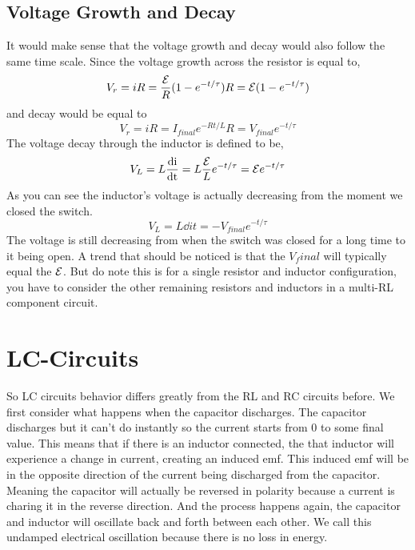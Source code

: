\subsection{Voltage Growth and Decay}
It would make sense that the voltage growth and decay would also follow the same time scale.
Since the voltage growth across the resistor is equal to,
\begin{equation*}
	V_r = iR = \frac{\mathcal{E}}{R}(1-e^{-t/\tau})R=\mathcal{E}(1-e^{-t/\tau})
\end{equation*}
and decay would be equal to 
\begin{equation*}
	V_r = iR = I_{final}e^{-Rt/L}R = V_{final}e^{-t/\tau}
\end{equation*}
The voltage decay through the inductor is defined to be, 
\begin{align*}
	V_L = L\frac{\mathrm{d i}}{\mathrm{d t}} = L\frac{\mathcal{E}}{L}e^{-t/\tau}=\mathcal{E} e^{-t/\tau}
\end{align*}
As you can see the inductor's voltage is actually decreasing from the moment we closed the switch.
\begin{equation*}
	V_L = L\dd{i}{t} = -V_{final}e^{-t/\tau}
\end{equation*}
The voltage is still decreasing from when the switch was closed for a long time to it being open. A trend that should be noticed is that the $V_final$ will typically equal the $\mathcal{E}$. But do note this is for a single resistor and inductor configuration, you have to consider the other remaining resistors and inductors in a multi-RL component circuit. 


\section{LC-Circuits}
So LC circuits behavior differs greatly from the RL and RC circuits before. We first consider what happens when the capacitor discharges. The capacitor discharges but it can't do instantly so the current starts from 0 to some final value. This means that if there is an inductor connected, the that inductor will experience a change in current, creating an induced emf. This induced emf will be in the opposite direction of the current being discharged from the capacitor. Meaning the capacitor will actually be reversed in polarity  because a current is charing it in the reverse direction. And the process happens again, the capacitor and inductor will oscillate back and forth between each other. We call this  undamped electrical oscillation because there is no loss in energy.

